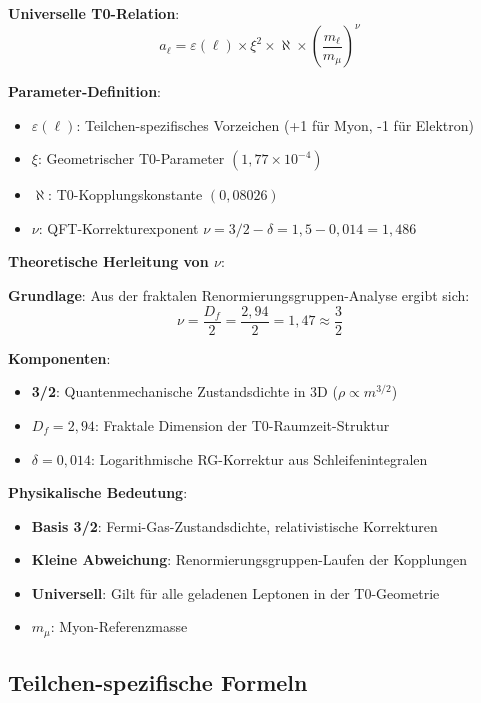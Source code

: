 \documentclass[12pt,a4paper]{article}
\newcommand{\xipar}{\xi}
\newcommand{\nulep}{\nu}
\newcommand{\epsilonlep}{\varepsilon}
\begin{document}
	\textbf{Universelle T0-Relation}:
	\begin{equation}
		a_\ell = \epsilonlep(\ell) \times \xipar^2 \times \aleph \times \left(\frac{m_\ell}{m_\mu}\right)^\nulep
	\end{equation}
	
	\textbf{Parameter-Definition}:
	\begin{itemize}
		\item \textbf{$\epsilonlep(\ell)$}: Teilchen-spezifisches Vorzeichen (+1 f\"ur Myon, -1 f\"ur Elektron)
		\item \textbf{$\xipar$}: Geometrischer T0-Parameter $(1{,}77 \times 10^{-4})$
		\item \textbf{$\aleph$}: T0-Kopplungskonstante $(0{,}08026)$
		\item \textbf{$\nulep$}: QFT-Korrekturexponent $\nulep = 3/2 - \delta = 1{,}5 - 0{,}014 = 1{,}486$
	\end{itemize}
	
	\textbf{Theoretische Herleitung von $\nulep$}:
	
	\textbf{Grundlage}: Aus der fraktalen Renormierungsgruppen-Analyse ergibt sich:
	\begin{equation}
		\nulep = \frac{D_f}{2} = \frac{2{,}94}{2} = 1{,}47 \approx \frac{3}{2}
	\end{equation}
	
	\textbf{Komponenten}:
	\begin{itemize}
		\item \textbf{3/2}: Quantenmechanische Zustandsdichte in 3D ($\rho \propto m^{3/2}$)
		\item \textbf{$D_f = 2{,}94$}: Fraktale Dimension der T0-Raumzeit-Struktur
		\item \textbf{$\delta = 0{,}014$}: Logarithmische RG-Korrektur aus Schleifenintegralen
	\end{itemize}
	
	\textbf{Physikalische Bedeutung}:
	\begin{itemize}
		\item \textbf{Basis 3/2}: Fermi-Gas-Zustandsdichte, relativistische Korrekturen
		\item \textbf{Kleine Abweichung}: Renormierungsgruppen-Laufen der Kopplungen
		\item \textbf{Universell}: Gilt f\"ur alle geladenen Leptonen in der T0-Geometrie
		\item \textbf{$m_\mu$}: Myon-Referenzmasse
	\end{itemize}
	
	\subsection{Teilchen-spezifische Formeln}
	
\end{document}
